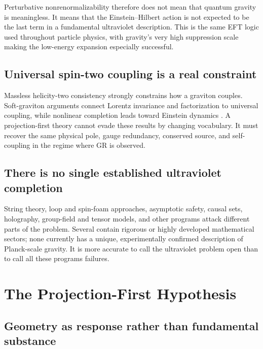 \documentclass[11pt]{article}
\begin{document}
Perturbative nonrenormalizability therefore does not mean that quantum gravity
is meaningless.  It means that the Einstein--Hilbert action is not expected
to be the last term in a fundamental ultraviolet description.  This is the
same EFT logic used throughout particle physics, with gravity's very high
suppression scale making the low-energy expansion especially successful.

\subsection{Universal spin-two coupling is a real constraint}

Massless helicity-two consistency strongly constrains how a graviton couples.
Soft-graviton arguments connect Lorentz invariance and factorization to
universal coupling, while nonlinear completion leads toward Einstein
dynamics \cite{WeinbergSoft,Deser}.  A projection-first theory cannot evade
these results by changing vocabulary.  It must recover the same physical pole,
gauge redundancy, conserved source, and self-coupling in the regime where GR
is observed.

\subsection{There is no single established ultraviolet completion}

String theory, loop and spin-foam approaches, asymptotic safety, causal sets,
holography, group-field and tensor models, and other programs attack
different parts of the problem.  Several contain rigorous or highly
developed mathematical sectors; none currently has a unique, experimentally
confirmed description of Planck-scale gravity.  It is more accurate to call
the ultraviolet problem open than to call all these programs failures.

\section{The Projection-First Hypothesis}

\subsection{Geometry as response rather than fundamental substance}
\end{document}
